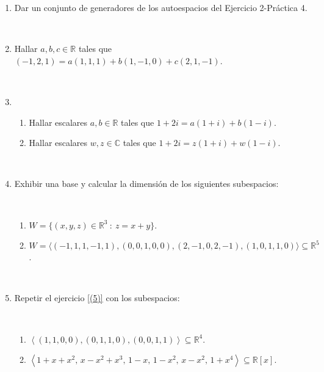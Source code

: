 \documentclass[12pt]{amsart}
\begin{document}
\begin{enumerate}[resume]
\item Dar un conjunto de generadores  de los autoespacios del Ejercicio 2-Pr\'actica 4.

\

\item  Hallar $a, b, c\in \mathbb{R}$ tales que $(-1,2,1)=a(1,1,1)+b(1,-1,0)+c(2,1,-1)$.

\

\item
\begin{enumerate}
	\item Hallar escalares $a, b \in \mathbb R$ tales que $1+2i=a(1+i)+b(1-i)$.
	\item  Hallar escalares $w, z \in \mathbb C$ tales que $1+2i=z(1+i)+w(1-i)$.
\end{enumerate}
% 
% 		
% 
\

\item  Exhibir una base y calcular la dimensi\'on de los siguientes subespacios:

\

\begin{enumerate}
    \item $W=\{(x,y,z) \in \mathbb{R}^3 \ : \ z = x + y \}$.
	\item $W = \langle (-1, 1, 1, -1, 1),  (0, 0, 1, 0, 0), (2, -1, 0, 2, -1), (1, 0, 1, 1, 0) \rangle \subseteq \mathbb R^5$.
\end{enumerate}


\


\item  Repetir el ejercicio \eqref{(5)} con los subespacios:

\

\begin{enumerate}
	\item ${\left\langle(1,1,0,0),(0,1,1,0),(0,0,1,1)\right\rangle}\subseteq \mathbb{R}^4$.
	\item ${\left\langle 1+x+x^2,\, x-x^2+x^3,\, 1-x,\, 1-x^2,\, x-x^2,\, 1+x^4\right\rangle}\subseteq \mathbb{R}[x]$.
\end{enumerate}


\end{enumerate}
\end{document}
